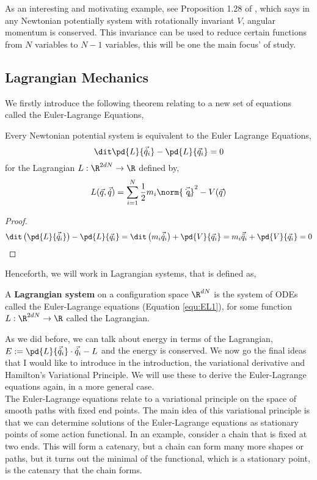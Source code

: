\noindent
As an interesting and motivating example, see Proposition 1.28 of \cite{holm_schmah_stoica_2009}, which says in any Newtonian potentially system with rotationally invariant $V$, angular momentum is conserved. This invariance can be used to reduce certain functions from $N$ variables to $N - 1$ variables, this will be one the main focus' of study.

\subsection{Lagrangian Mechanics}
We firstly introduce the following theorem relating to a new set of equations called the Euler-Lagrange Equations,
\begin{nthm}
  Every Newtonian potential system is equivalent to the Euler Lagrange Equations,
  \begin{equation}
    \dit \pd{L}{\vec{\dot q}_i} - \pd{L}{\vec q_i} = 0 \label{equ:EL1}
  \end{equation}
  for the Lagrangian $L : \R^{2dN} \to \R$ defined by,
  $$ L(\vec q, \vec{\dot q}) = \sum_{i=1}^N \frac{1}{2}m_i\norm{\vec{\dot q_i}}^2 - V(\vec q) $$
\end{nthm}
\begin{proof}
  $$ \dit \left( \pd{L}{\vec{\dot q}_i} \right) - \pd{L}{\vec q_i} = \dit\left( m_i\vec{\dot q}_i \right) + \pd{V}{\vec q_i} =  m_i\vec{\ddot q}_i + \pd{V}{\vec q_i} = 0$$
\end{proof}

\noindent
Henceforth, we will work in Lagrangian systems, that is defined as,
\begin{ndefi}
  A \textbf{Lagrangian system} on a configuration space $\R^{dN}$ is the system of ODEs called the Euler-Lagrange equations (Equation \ref{equ:EL1}), for some function $L : \R^{2dN} \to \R$ called the Lagrangian.
\end{ndefi}

\noindent
As we did before, we can talk about energy in terms of the Lagrangian, $E := \pd{L}{\vec{\dot q}_i} \cdot \vec{\dot q}_i - L$ and the energy is conserved. We now go the final ideas that I would like to introduce in the introduction, the variational derivative and Hamilton's Variational Principle. We will use these to derive the Euler-Lagrange equations again, in a more general case. \\

\noindent
The Euler-Lagrange equations relate to a variational principle on the space of smooth paths with fixed end points. The main idea of this variational principle is that we can determine solutions of the Euler-Lagrange equations as stationary points of some action functional. In an example, consider a chain that is fixed at two ends. This will form a catenary, but a chain can form many more shapes or paths, but it turns out the minimal of the functional, which is a stationary point, is the catenary that the chain forms.\\

